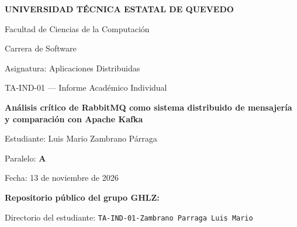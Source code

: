 \documentclass[12pt,a4paper]{article}
\begin{document}
\hypersetup{pageanchor=false}
\begin{titlepage}
\centering
{\Large\bfseries UNIVERSIDAD TÉCNICA ESTATAL DE QUEVEDO\par}
\vspace{1cm}
{\large Facultad de Ciencias de la Computación\par}
{\large Carrera de Software\par}
\vspace{2cm}
{\large Asignatura: Aplicaciones Distribuidas\par}
{\large TA-IND-01 — Informe Académico Individual\par}
\vspace{1.6cm}
{\LARGE\bfseries Análisis crítico de RabbitMQ como sistema distribuido de mensajería y comparación con Apache Kafka\par}
\vspace{2cm}
{\large Estudiante: Luis Mario Zambrano Párraga\par}
{\large Paralelo: \textbf{A}\par}
{\large Fecha: 13 de noviembre de 2026\par}
\vfill
{\small\bfseries Repositorio público del grupo GHLZ:\par}
\vspace{3mm}
\noindent{}\par
\vspace{2mm}
{\small Directorio del estudiante: \texttt{TA-IND-01-Zambrano Parraga Luis Mario}\par}
\end{titlepage}
\hypersetup{pageanchor=true}
\end{document}

